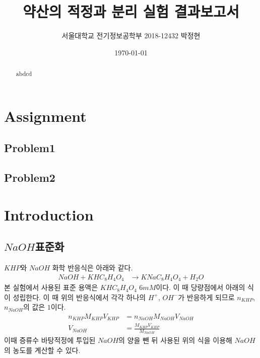 \documentclass[%
 reprint,
 amsmath,amssymb,
 aps,
]{revtex4-2}
\begin{document}
\title{약산의 적정과 분리 실험 결과보고서}

\author{서울대학교 전기정보공학부 2018-12432 박정현}
\date{\today}%

\begin{abstract}
abdcd
\end{abstract}

\maketitle


\section{\label{sec:level1}Assignment}
\subsection{\label{sec:level2}Problem1}
\subsection{\label{sec:level2}Problem2}


\section{\label{sec:level1}Introduction}
\subsection{\label{sec:level2}$NaOH$표준화}
$KHP$와 $NaOH$ 화학 반응식은 아래와 같다.
\begin{align}
	NaOH + KHC_{8}H_{4}O_{4} &\rightarrow KNaC_{8}H_{4}O_{4} + H_{2}O
\end{align}
본 실험에서 사용된 표준 용액은 $KHC_{8}H_{4}O_{4}$ $6mM$이다. 이 때 당량점에서 아래의 식이 성립한다. 이 때 위의 반응식에서 각각 하나의 $H^{+}$, $OH^{-}$가 반응하게 되므로 $n_{KHP}$, $n_{NaOH}$의 값은 $1$이다.
\begin{align}
	n_{KHP}M_{KHP}V_{KHP} &= n_{NaOH}M_{NaOH}V_{NaOH}\\
	V_{NaOH} &= \frac{M_{KHP}V_{KHP}}{M_{NaOH}}
\end{align}
이때 증류수 바탕적정에 투입된 $NaOH$의 양을 뺀 뒤 사용된 위의 식을 이용해 $NaOH$의 농도를 계산할 수 있다.
\end{document}
